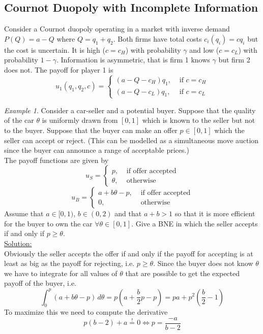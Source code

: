 \documentclass[a4paper, 12pt]{article}
\theoremstyle{plain}
\theoremstyle{definition}
\theoremstyle{lemma}
\theoremstyle{remark}
\theoremstyle{corollary}
\theoremstyle{example}
\newtheorem{example}[theorem]{Example}
\begin{document}
	\subsection{Cournot Duopoly with Incomplete Information}
	Consider a Cournot duopoly operating in a market with inverse demand $P(Q) = a-Q$ where $Q = q_1+q_2$. Both firms have total costs $c_i(q_i) = cq_i$ but the cost is uncertain. It is high ($c = c_H$) with probability $\gamma$ and low ($c = c_L$) with probability $1-\gamma$. Information is asymmetric, that is firm 1 knows $\gamma$ but firm 2 does not. The payoff for player 1 is \[u_1(q_1,q_2,c) = \begin{cases}
		(a-Q-c_H)q_1, & \text{ if } c = c_H\\
		(a-Q-c_L)q_1, & \text{ if } c = c_L
	\end{cases}\]
	\begin{example}
		Consider a car-seller and a potential buyer. Suppose that the quality of the car $\theta$ is uniformly drawn from $[0,1]$ which is known to the seller but not to the buyer. Suppose that the buyer can make an offer $p \in [0,1]$ which the seller can accept or reject. (This can be modelled as a simultaneous move auction since the buyer can announce a range of acceptable prices.)\\
		The payoff functions are given by \[u_S = \begin{cases}
			p, & \text{ if offer accepted}\\
			\theta, & \text{ otherwise}
		\end{cases}\]
		\[u_B = \begin{cases}
			a+b\theta-p, & \text{ if offer accepted}\\
			0, & \text{ otherwise}
		\end{cases}\]
		Assume that $a \in [0,1)$, $b \in (0,2)$ and that $a+b>1$ so that it is more efficient for the buyer to own the car $\forall \theta \in [0,1]$. Give a BNE in which the seller accepts if and only if $p \geq \theta$.\\
		\underline{Solution:}\\
		Obviously the seller accepts the offer if and only if the payoff for accepting is at least as big as the payoff for rejecting, i.e. $p \geq \theta$. Since the buyer does not know $\theta$ we have to integrate for all values of $\theta$ that are possible to get the expected payoff of the buyer, i.e. \[\int_0^p (a+b\theta-p)\, d\theta = p(a+\frac{b}{2}p - p) = pa + p^2(\frac{b}{2}-1)\]
		To maximize this we need to compute the derivative \[p(b-2)+a \overset{!}{=} 0 \Leftrightarrow p = \frac{-a}{b-2}\]
	\end{example}
\end{document}
